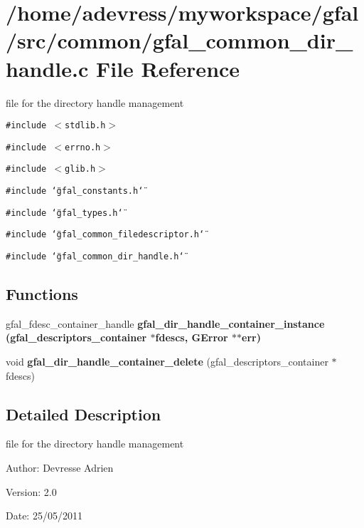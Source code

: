 \section{/home/adevress/myworkspace/gfal/src/common/gfal\_\-common\_\-dir\_\-handle.c File Reference}
\label{gfal__common__dir__handle_8c}
file for the directory handle management 

{\tt \#include $<$stdlib.h$>$}\par
{\tt \#include $<$errno.h$>$}\par
{\tt \#include $<$glib.h$>$}\par
{\tt \#include \char`\"{}gfal\_\-constants.h\char`\"{}}\par
{\tt \#include \char`\"{}gfal\_\-types.h\char`\"{}}\par
{\tt \#include \char`\"{}gfal\_\-common\_\-filedescriptor.h\char`\"{}}\par
{\tt \#include \char`\"{}gfal\_\-common\_\-dir\_\-handle.h\char`\"{}}\par
\subsection*{Functions}
\begin{CompactItemize}
\item 
gfal\_\-fdesc\_\-container\_\-handle \bf{gfal\_\-dir\_\-handle\_\-container\_\-instance} (gfal\_\-descriptors\_\-container $\ast$fdescs, GError $\ast$$\ast$err)
\item 
void \textbf{gfal\_\-dir\_\-handle\_\-container\_\-delete} (gfal\_\-descriptors\_\-container $\ast$fdescs)\label{gfal__common__dir__handle_8c_266f240b644154dade8bdb39e4c20efc}

\end{CompactItemize}


\subsection{Detailed Description}
file for the directory handle management 

\begin{Desc}
\item[Author:]Devresse Adrien \end{Desc}
\begin{Desc}
\item[Version:]2.0 \end{Desc}
\begin{Desc}
\item[Date:]25/05/2011 \end{Desc}


